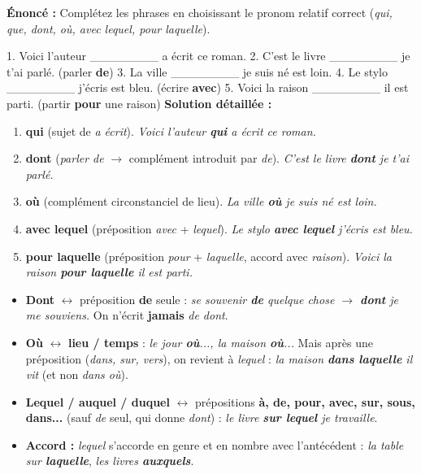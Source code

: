 \documentclass[11pt]{article}
\begin{document}
\begin{exoresolu}
\textbf{Énoncé :} Complétez les phrases en choisissant le pronom relatif correct (\emph{qui, que, dont, où, avec lequel, pour laquelle}).

1. Voici l'auteur \_\_\_\_\_\_\_\_ a écrit ce roman.
2. C'est le livre \_\_\_\_\_\_\_\_ je t'ai parlé. (parler \textbf{de})
3. La ville \_\_\_\_\_\_\_\_ je suis né est loin.
4. Le stylo \_\_\_\_\_\_\_\_ j'écris est bleu. (écrire \textbf{avec})
5. Voici la raison \_\_\_\_\_\_\_\_ il est parti. (partir \textbf{pour} une raison)
\tcblower
\textbf{Solution détaillée :}
\begin{enumerate}
    \item \textbf{qui} (sujet de \emph{a écrit}). \emph{Voici l'auteur \textbf{qui} a écrit ce roman.}
    \item \textbf{dont} (\emph{parler de} $\rightarrow$ complément introduit par \emph{de}). \emph{C'est le livre \textbf{dont} je t'ai parlé.}
    \item \textbf{où} (complément circonstanciel de lieu). \emph{La ville \textbf{où} je suis né est loin.}
    \item \textbf{avec lequel} (préposition \emph{avec} + \emph{lequel}). \emph{Le stylo \textbf{avec lequel} j'écris est bleu.}
    \item \textbf{pour laquelle} (préposition \emph{pour} + \emph{laquelle}, accord avec \emph{raison}). \emph{Voici la raison \textbf{pour laquelle} il est parti.}
\end{enumerate}
\end{exoresolu}

\begin{attention}
\begin{itemize}
    \item \textbf{Dont} $\leftrightarrow$ préposition \textbf{de} seule : \emph{se souvenir \textbf{de} quelque chose $\rightarrow$ \textbf{dont} je me souviens.} On n'écrit \textbf{jamais} \emph{de dont}.
    \item \textbf{Où} $\leftrightarrow$ \textbf{lieu / temps} : \emph{le jour \textbf{où}..., la maison \textbf{où}...} Mais après une préposition (\emph{dans, sur, vers}), on revient à \emph{lequel} : \emph{la maison \textbf{dans laquelle} il vit} (et non \emph{dans où}).
    \item \textbf{Lequel / auquel / duquel} $\leftrightarrow$ prépositions \textbf{à, de, pour, avec, sur, sous, dans...} (sauf \emph{de} seul, qui donne \emph{dont}) : \emph{le livre \textbf{sur lequel} je travaille}.
    \item \textbf{Accord :} \emph{lequel} s'accorde en genre et en nombre avec l'antécédent : \emph{la table sur \textbf{laquelle}}, \emph{les livres \textbf{auxquels}}.
\end{itemize}
\end{attention}
\end{document}
